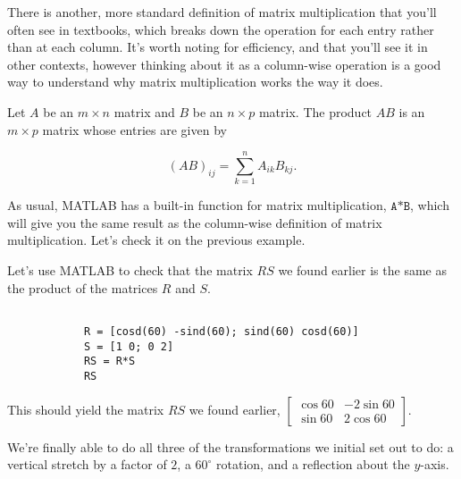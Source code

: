 \documentclass{ximera}
\begin{document}
\begin{exploration}
\begin{remark}
\begin{definition}
        \end{definition}

        There is another, more standard definition of matrix multiplication that you'll often see in textbooks, which breaks down the operation for each entry rather than at each column. It's worth noting for efficiency, and that you'll see it in other contexts, however thinking about it as a column-wise operation is a good way to understand why matrix multiplication works the way it does.

        \begin{definition}

            Let $A$ be an $m\times n$ matrix and $B$ be an $n\times p$ matrix. The product $AB$ is an $m\times p$ matrix whose entries are given by 

            $$(AB)_{ij}=\sum_{k=1}^n A_{ik}B_{kj}.$$
        \end{definition}

    \end{remark}

    As usual, MATLAB has a built-in function for matrix multiplication, $\texttt{A*B}$, which will give you the same result as the column-wise definition of matrix multiplication. Let's check it on the previous example.

    \begin{example}

        Let's use MATLAB to check that the matrix $RS$ we found earlier is the same as the product of the matrices $R$ and $S$.

        \begin{verbatim}

            R = [cosd(60) -sind(60); sind(60) cosd(60)]
            S = [1 0; 0 2]
            RS = R*S
            RS
        \end{verbatim}

        This should yield the matrix $RS$ we found earlier, $\begin{bmatrix} \cos 60 & -2\sin 60 \\ \sin 60 & 2\cos 60 \end{bmatrix}$.
    \end{example}

    \begin{example}

        We're finally able to do all three of the transformations we initial set out to do: a vertical stretch by a factor of $2$, a $60^\circ$ rotation, and a reflection about the $y$-axis.


\end{example}
\end{exploration}
\end{document}
